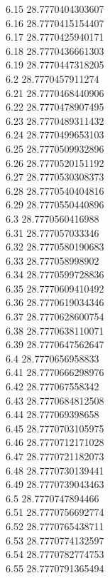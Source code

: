 {6.15	28.7770404303607\\
6.16	28.7770415154407\\
6.17	28.7770425940171\\
6.18	28.7770436661303\\
6.19	28.7770447318205\\
6.2	28.7770457911274\\
6.21	28.7770468440906\\
6.22	28.7770478907495\\
6.23	28.7770489311432\\
6.24	28.7770499653103\\
6.25	28.7770509932896\\
6.26	28.7770520151192\\
6.27	28.7770530308373\\
6.28	28.7770540404816\\
6.29	28.7770550440896\\
6.3	28.7770560416988\\
6.31	28.777057033346\\
6.32	28.7770580190683\\
6.33	28.777058998902\\
6.34	28.7770599728836\\
6.35	28.7770609410492\\
6.36	28.7770619034346\\
6.37	28.7770628600754\\
6.38	28.7770638110071\\
6.39	28.7770647562647\\
6.4	28.7770656958833\\
6.41	28.7770666298976\\
6.42	28.777067558342\\
6.43	28.7770684812508\\
6.44	28.777069398658\\
6.45	28.7770703105975\\
6.46	28.7770712171028\\
6.47	28.7770721182073\\
6.48	28.7770730139441\\
6.49	28.7770739043463\\
6.5	28.7770747894466\\
6.51	28.7770756692774\\
6.52	28.7770765438711\\
6.53	28.7770774132597\\
6.54	28.7770782774753\\
6.55	28.7770791365494\\
}

